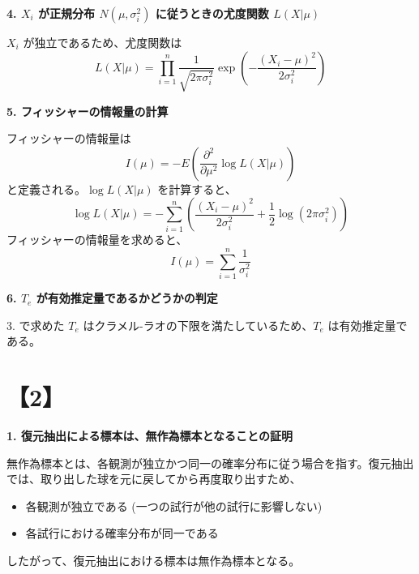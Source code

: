 \documentclass[10pt]{jsarticle}
\begin{document}
{\bf 4. \(X_i\) が正規分布 \(N(\mu, \sigma_i^2)\) に従うときの尤度関数 \(L(X | \mu)\)}

\(X_i\) が独立であるため、尤度関数は
\[
    L(X | \mu) = \prod_{i=1}^n \frac{1}{\sqrt{2\pi \sigma_i^2}} \exp\left( -\frac{(X_i - \mu)^2}{2\sigma_i^2} \right)
\]

{\bf 5. フィッシャーの情報量の計算}

フィッシャーの情報量は
\[
    I(\mu) = -E\left( \frac{\partial^2}{\partial \mu^2} \log L(X | \mu) \right)
\]
と定義される。\( \log L(X | \mu) \) を計算すると、
\[
    \log L(X | \mu) = -\sum_{i=1}^n \left( \frac{(X_i - \mu)^2}{2 \sigma_i^2} + \frac{1}{2} \log (2\pi \sigma_i^2) \right)
\]
フィッシャーの情報量を求めると、
\[
    I(\mu) = \sum_{i=1}^n \frac{1}{\sigma_i^2}
\]

{\bf 6. \(T_e\) が有効推定量であるかどうかの判定}

3. で求めた \(T_e\) はクラメル-ラオの下限を満たしているため、\(T_e\) は有効推定量である。

\bigskip

\section*{【2】}
{\bf 1. 復元抽出による標本は、無作為標本となることの証明}

無作為標本とは、各観測が独立かつ同一の確率分布に従う場合を指す。復元抽出では、取り出した球を元に戻してから再度取り出すため、

\begin{itemize}
    \item 各観測が独立である (一つの試行が他の試行に影響しない)
    \item 各試行における確率分布が同一である
\end{itemize}

したがって、復元抽出における標本は無作為標本となる。
\end{document}
